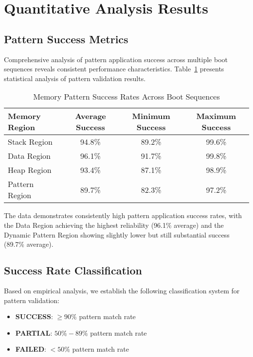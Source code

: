 \documentclass[11pt,a4paper]{article}
\begin{document}
\section{Quantitative Analysis Results}

\subsection{Pattern Success Metrics}

Comprehensive analysis of pattern application success across multiple boot sequences reveals consistent performance characteristics. Table~\ref{tab:pattern_success} presents statistical analysis of pattern validation results.

\begin{table}[H]
\centering
\begin{tabular}{@{}lccc@{}}
\toprule
\textbf{Memory Region} & \textbf{Average Success} & \textbf{Minimum Success} & \textbf{Maximum Success} \\
\midrule
Stack Region       & 94.8\%   & 89.2\%   & 99.6\% \\
Data Region        & 96.1\%   & 91.7\%   & 99.8\% \\
Heap Region        & 93.4\%   & 87.1\%   & 98.9\% \\
Pattern Region     & 89.7\%   & 82.3\%   & 97.2\% \\
\bottomrule
\end{tabular}
\caption{Memory Pattern Success Rates Across Boot Sequences}
\label{tab:pattern_success}
\end{table}

The data demonstrates consistently high pattern application success rates, with the Data Region achieving the highest reliability (96.1\% average) and the Dynamic Pattern Region showing slightly lower but still substantial success (89.7\% average).

\subsection{Success Rate Classification}

Based on empirical analysis, we establish the following classification system for pattern validation:

\begin{itemize}
    \item \textbf{SUCCESS}: $\geq 90\%$ pattern match rate
    \item \textbf{PARTIAL}: $50\% - 89\%$ pattern match rate  
    \item \textbf{FAILED}: $< 50\%$ pattern match rate
\end{itemize}
\end{document}
